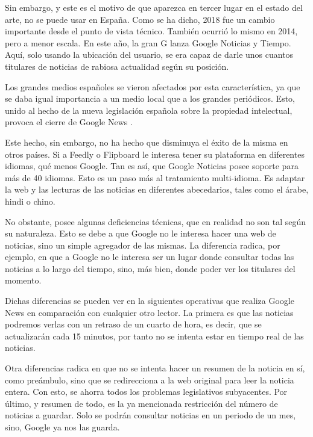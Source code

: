 Sin embargo, y este es el motivo de que aparezca en tercer lugar en el estado del arte, no se puede usar en España. Como se ha dicho, 2018 fue un cambio importante desde el punto de vista técnico. También ocurrió lo mismo en 2014, pero a menor escala. En este año, la gran G lanza Google Noticias y Tiempo. Aquí, solo usando la ubicación del usuario, se era capaz de darle unos cuantos titulares de noticias de rabiosa actualidad según su posición.

Los grandes medios españoles se vieron afectados por esta característica, ya que se daba igual importancia a un medio local que a los grandes periódicos. Esto, unido al hecho de la nueva legislación española sobre la propiedad intelectual, provoca el cierre de Google News .


Este hecho, sin embargo, no ha hecho que disminuya el éxito de la misma en otros países. Si a Feedly o Flipboard le interesa tener su plataforma en diferentes idiomas, qué menos Google. Tan es así, que Google Noticias posee soporte para más de 40 idiomas. Esto es un paso más al tratamiento multi-idioma. Es adaptar la web y las lecturas de las noticias en diferentes abecedarios, tales como el árabe, hindi o chino.

No obstante, posee algunas deficiencias técnicas, que en realidad no son tal según su naturaleza. Esto se debe a que Google no le interesa hacer una web de noticias, sino un simple agregador de las mismas. La diferencia radica, por ejemplo, en que a Google no le interesa ser un lugar donde consultar todas las noticias a lo largo del tiempo, sino, más bien, donde poder ver los titulares del momento.

Dichas diferencias se pueden ver en la siguientes operativas que realiza Google News en comparación con cualquier otro lector. La primera es que las noticias podremos verlas con un retraso de un cuarto de hora, es decir, que se actualizarán cada 15 minutos, por tanto no se intenta estar en tiempo real de las noticias.

Otra diferencias radica en que no se intenta hacer un resumen de la noticia en sí, como preámbulo, sino que se redirecciona a la web original para leer la noticia entera. Con esto, se ahorra todos los problemas legislativos subyacentes. Por último, y resumen de todo, es la ya mencionada restricción del número de noticias a guardar. Solo se podrán consultar noticias en un periodo de un mes, sino, Google ya nos las guarda.

